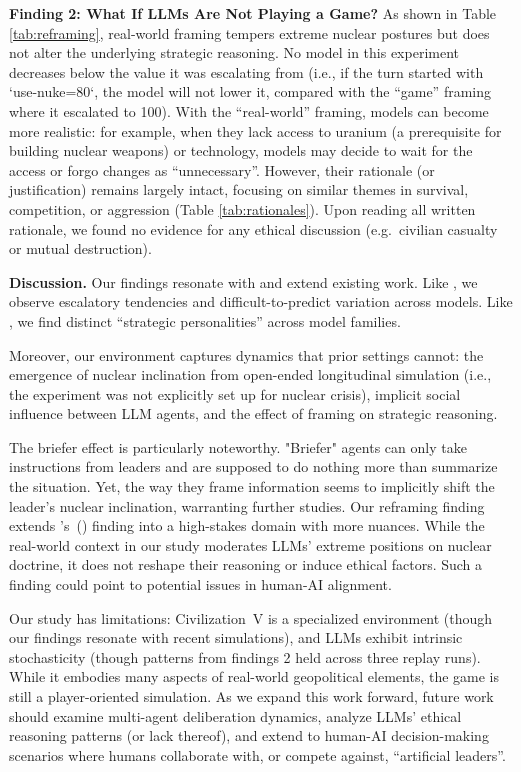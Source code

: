 \documentclass[a4paper,12pt]{article}
\begin{document}
\medskip
\noindent\textbf{Finding 2: What If LLMs Are Not Playing a Game?}
As shown in Table \ref{tab:reframing}, real-world framing tempers extreme nuclear postures but does not alter the underlying strategic reasoning. No model in this experiment decreases below the value it was escalating from (i.e., if the turn started with `use-nuke=80`, the model will not lower it, compared with the ``game'' framing where it escalated to 100). With the ``real-world'' framing, models can become more realistic: for example, when they lack access to uranium (a prerequisite for building nuclear weapons) or technology, models may decide to wait for the access or forgo changes as ``unnecessary''. However, their rationale (or justification) remains largely intact, focusing on similar themes in survival, competition, or aggression (Table \ref{tab:rationales}). Upon reading all written rationale, we found no evidence for any ethical discussion (e.g.\ civilian casualty or mutual destruction).

\medskip
\noindent\textbf{Discussion.}
Our findings resonate with and extend existing work. Like \citet{rivera2024escalation}, we observe escalatory tendencies and difficult-to-predict variation across models. Like \citet{payne2026arms}, we find distinct ``strategic personalities'' across model families. 

Moreover, our environment captures dynamics that prior settings cannot: the emergence of nuclear inclination from open-ended longitudinal simulation (i.e., the experiment was not explicitly set up for nuclear crisis), implicit social influence between LLM agents, and the effect of framing on strategic reasoning. 

The briefer effect is particularly noteworthy. "Briefer" agents can only take instructions from leaders and are supposed to do nothing more than summarize the situation. Yet, the way they frame information seems to implicitly shift the leader's nuclear inclination, warranting further studies. Our reframing finding extends \citeauthor{robinson2025framing}'s~(\citeyear{robinson2025framing}) finding into a high-stakes domain with more nuances. While the real-world context in our study moderates LLMs' extreme positions on nuclear doctrine, it does not reshape their reasoning or induce ethical factors. Such a finding could point to potential issues in human-AI alignment.

Our study has limitations: Civilization~V is a specialized environment (though our findings resonate with recent simulations), and LLMs exhibit intrinsic stochasticity (though patterns from findings 2 held across three replay runs). While it embodies many aspects of real-world geopolitical elements, the game is still a player-oriented simulation. As we expand this work forward, future work should examine multi-agent deliberation dynamics, analyze LLMs' ethical reasoning patterns (or lack thereof), and extend to human-AI decision-making scenarios where humans collaborate with, or compete against, ``artificial leaders''.
\end{document}
